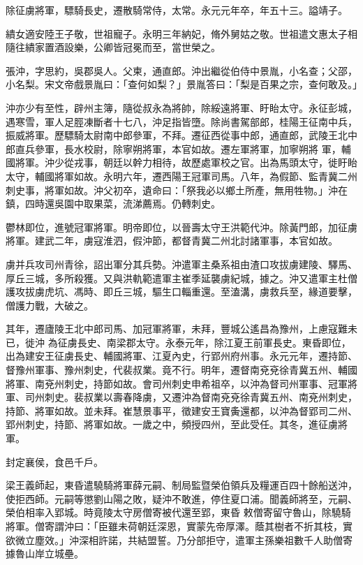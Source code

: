 \begin{pinyinscope}
 除征虜將軍，驃騎長史，遷散騎常侍，太常。永元元年卒，年五十三。謚靖子。



 繢女適安陸王子敬，世祖寵子。永明三年納妃，脩外舅姑之敬。世祖遣文惠太子相隨往繢家置酒設樂，公卿皆冠冕而至，當世榮之。



 張沖，字思約，吳郡吳人。父柬，通直郎。沖出繼從伯侍中景胤，小名查；父邵，小名梨。宋文帝戲景胤曰：「查何如梨？」景胤答曰：「梨是百果之宗，查何敢及。」



 沖亦少有至性，辟州主簿，隨從叔永為將帥，除綏遠將軍、盱眙太守。永征彭城，遇寒雪，軍人足脛凍斷者十七八，沖足指皆墮。除尚書駕部郎，桂陽王征南中兵，振威將軍。歷驃騎太尉南中郎參軍，不拜。遷征西從事中郎，通直郎，武陵王北中郎直兵參軍，長水校尉，除寧朔將軍，本官如故。遷左軍將軍，加寧朔將
 軍，輔國將軍。沖少從戎事，朝廷以幹力相待，故歷處軍校之官。出為馬頭太守，徙盱眙太守，輔國將軍如故。永明六年，遷西陽王冠軍司馬。八年，為假節、監青冀二州刺史事，將軍如故。沖父初卒，遺命曰：「祭我必以鄉土所產，無用牲物。」沖在鎮，四時還吳園中取果菜，流涕薦焉。仍轉刺史。



 鬱林即位，進號冠軍將軍。明帝即位，以晉壽太守王洪範代沖。除黃門郎，加征虜將軍。建武二年，虜寇淮泗，假沖節，都督青冀二州北討諸軍事，本官如故。



 虜并兵攻司州青徐，詔出軍分其兵勢。沖遣軍主桑系祖由渣口攻拔虜建陵、驛馬、厚丘三城，多所殺獲。又與洪軌範遣軍主崔季延襲虜紀城，據之。沖又遣軍主杜僧護攻拔虜虎坑、馮時、即丘三城，驅生口輜重還。至溘溝，虜救兵至，緣道要擊，僧護力戰，大破之。



 其年，遷廬陵王北中郎司馬、加冠軍將軍，未拜，豐城公遙昌為豫州，上慮寇難未已，徙沖
 為征虜長史、南梁郡太守。永泰元年，除江夏王前軍長史。東昏即位，出為建安王征虜長史、輔國將軍、江夏內史，行郢州府州事。永元元年，遷持節、督豫州軍事、豫州刺史，代裴叔業。竟不行。明年，遷督南兗兗徐青冀五州、輔國將軍、南兗州刺史，持節如故。會司州刺史申希祖卒，以沖為督司州軍事、冠軍將軍、司州刺史。裴叔業以壽春降虜，又遷沖為督南兗兗徐青冀五州、南兗州刺史，持節、將軍如故。並未拜。崔慧景事平，徵建安王寶夤還都，以沖為督郢司二州、郢州刺史，持節、將軍如故。一歲之中，頻授四州，至此受任。其冬，進征虜將軍。



 封定襄侯，食邑千戶。



 梁王義師起，東昏遣驍騎將軍薛元嗣、制局監暨榮伯領兵及糧運百四十餘船送沖，使拒西師。元嗣等懲劉山陽之敗，疑沖不敢進，停住夏口浦。聞義師將至，元嗣、榮伯相率入郢城。時竟陵太守房僧寄被代還至郢，東昏
 敕僧寄留守魯山，除驍騎將軍。僧寄謂沖曰：「臣雖未荷朝廷深恩，實蒙先帝厚澤。蔭其樹者不折其枝，實欲微立塵效。」沖深相許諾，共結盟誓。乃分部拒守，遣軍主孫樂祖數千人助僧寄據魯山岸立城壘。




\end{pinyinscope}
